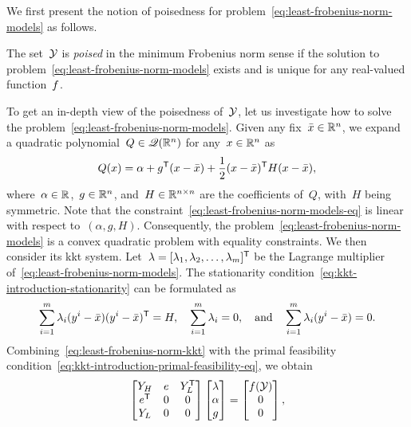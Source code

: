 We first present the notion of poisedness for problem~\cref{eq:least-frobenius-norm-models} as follows.

\begin{definition}[Poisedness]
    \label{def:poisedness}
    The set~$\xpt$ is \emph{poised} in the minimum Frobenius norm sense if the solution to problem~\cref{eq:least-frobenius-norm-models} exists and is unique for any real-valued function~$f$.
\end{definition}

To get an in-depth view of the poisedness of~$\xpt$, let us investigate how to solve the problem~\cref{eq:least-frobenius-norm-models}.
Given any fix~$\bar{x} \in \mathbb{R}^n$, we expand a quadratic polynomial~$Q \in \mathscr{Q}(\mathbb{R}^n)$ for any~$\iter \in \R^n$ as
\begin{equation*}
    Q(\iter) = \alpha + g^{\T} (\iter - \bar{x}) + \frac{1}{2} (\iter - \bar{x})^{\T} H(\iter - \bar{x}),
\end{equation*}
where~$\alpha \in \mathbb{R}$,~$g \in \mathbb{R}^n$, and~$H \in \mathbb{R}^{n \times n}$ are the coefficients of~$Q$, with~$H$ being symmetric.
Note that the constraint~\cref{eq:least-frobenius-norm-models-eq} is linear with respect to~$(\alpha, g, H)$.
Consequently, the problem~\cref{eq:least-frobenius-norm-models} is a convex quadratic problem with equality constraints.
We then consider its \gls{kkt} system.
Let~$\lm = [\lm_1, \lm_2, \dots, \lm_m]^{\T}$ be the Lagrange multiplier of~\cref{eq:least-frobenius-norm-models}.
The stationarity condition~\cref{eq:kkt-introduction-stationarity} can be formulated as
\begin{equation}
    \label{eq:least-frobenius-norm-kkt}
    \sum_{i = 1}^m \lm_i (y^i - \bar{x}) (y^i - \bar{x})^{\T} = H, \quad \sum_{i = 1}^m \lm_i = 0, \quad \text{and} \quad \sum_{i = 1}^m \lm_i (y^i - \bar{x}) = 0.
\end{equation}
Combining~\cref{eq:least-frobenius-norm-kkt} with the primal feasibility condition~\cref{eq:kkt-introduction-primal-feasibility-eq}, we obtain
\begin{equation}
    \label{eq:least-frobenius-kkt-system}
    \begin{bmatrix}
        Y_H     & e & Y_L^{\T}\\
        e^{\T}  & 0 & 0\\
        Y_L     & 0 & 0
    \end{bmatrix}
    \begin{bmatrix}
        \lm\\
        \alpha\\
        g
    \end{bmatrix}
    =
    \begin{bmatrix}
        \obj(\xpt)\\
        0\\
        0
    \end{bmatrix},
\end{equation}

